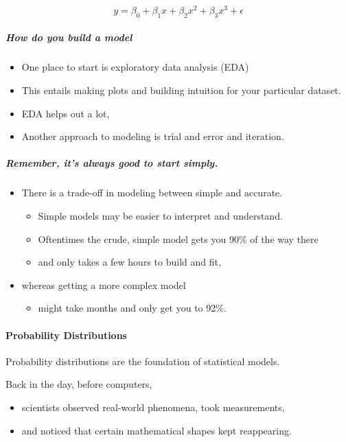 \documentclass[]{article}
\providecommand{\tightlist}{%
  \setlength{\itemsep}{0pt}\setlength{\parskip}{0pt}}
\let\oldparagraph\paragraph
\renewcommand{\paragraph}[1]{\oldparagraph{#1}\mbox{}}
\let\oldsubparagraph\subparagraph
\renewcommand{\subparagraph}[1]{\oldsubparagraph{#1}\mbox{}}
\begin{document}
\[y=\beta_0 + \beta_1x + \beta_2x^2 + \beta_3x^3 + \epsilon\]

\subparagraph{How do you build a model}\label{how-do-you-build-a-model}

\begin{itemize}
\tightlist
\item
  One place to start is exploratory data analysis (EDA)
\item
  This entails making plots and building intuition for your particular
  dataset.
\item
  EDA helps out a lot,
\item
  Another approach to modeling is trial and error and iteration.
\end{itemize}

\subparagraph{Remember, it's always good to start
simply.}\label{remember-its-always-good-to-start-simply.}

\begin{itemize}
\tightlist
\item
  There is a trade-off in modeling between simple and accurate.

  \begin{itemize}
  \tightlist
  \item
    Simple models may be easier to interpret and understand.
  \item
    Oftentimes the crude, simple model gets you 90\% of the way there
  \item
    and only takes a few hours to build and fit,
  \end{itemize}
\item
  whereas getting a more complex model

  \begin{itemize}
  \tightlist
  \item
    might take months and only get you to 92\%.
  \end{itemize}
\end{itemize}

\paragraph{Probability Distributions}\label{probability-distributions}

Probability distributions are the foundation of statistical models.

Back in the day, before computers,

\begin{itemize}
\tightlist
\item
  scientists observed real-world phenomena, took measurements,
\item
  and noticed that certain mathematical shapes kept reappearing.
\end{itemize}
\end{document}
